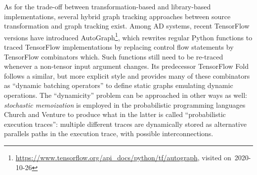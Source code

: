 As for the trade-off between transformation-based and library-based implementations, several hybrid
graph tracking approaches between source transformation and graph tracking exist.  Among AD systems,
recent TensorFlow versions have introduced
AutoGraph\footnote{\url{https://www.tensorflow.org/api_docs/python/tf/autograph}, visited
  on~2020-10-26}, which rewrites regular Python functions to traced TensorFlow implementations by
replacing control flow statements by TensorFlow combinators which.  Such functions still need to be
re-traced whenever a non-tensor input argument changes.  Its predecessor TensorFlow Fold
\parencite{looks2017deep} follows a similar, but more explicit style and provides many of these
combinators as \enquote{dynamic batching operators} to define static graphs emulating dynamic
operations.  The \enquote{dynamicity} problem can be approached in other ways as well:
\emph{stochastic memoization} is employed in the probabilistic programming languages Church
\parencite{goodman2012church} and Venture \parencite{mansinghka2014venture} to produce what in the
latter is called \enquote{probabilistic execution traces}: multiple different traces are dynamically
stored as alternative parallels paths in the execution trace, with possible interconnections.

